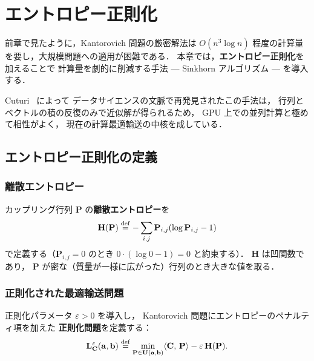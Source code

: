 
\chapter{エントロピー正則化}\label{chap:entropic}

前章で見たように，Kantorovich 問題の厳密解法は
$O(n^3 \log n)$ 程度の計算量を要し，大規模問題への適用が困難である．
本章では，\textbf{エントロピー正則化}を加えることで
計算量を劇的に削減する手法 --- Sinkhorn アルゴリズム --- を導入する．

Cuturi~\cite{Cuturi2013} によって
データサイエンスの文脈で再発見されたこの手法は，
行列とベクトルの積の反復のみで近似解が得られるため，
GPU 上での並列計算と極めて相性がよく，
現在の計算最適輸送の中核を成している．


\section{エントロピー正則化の定義}\label{sec:entropic-def}

\subsection{離散エントロピー}\label{subsec:discrete-entropy}

カップリング行列 $\mathbf{P}$ の\textbf{離散エントロピー}を
\begin{equation}\label{eq:entropy}
  \mathbf{H}(\mathbf{P})
  \overset{\mathrm{def}}{=} -\sum_{i,j} \mathbf{P}_{i,j}(\log \mathbf{P}_{i,j} - 1)
\end{equation}
で定義する（$\mathbf{P}_{i,j} = 0$ のとき $0 \cdot (\log 0 - 1) = 0$ と約束する）．
$\mathbf{H}$ は凹関数であり，
$\mathbf{P}$ が密な（質量が一様に広がった）行列のとき大きな値を取る．

\subsection{正則化された最適輸送問題}\label{subsec:regularized-ot}

正則化パラメータ $\varepsilon > 0$ を導入し，
Kantorovich 問題にエントロピーのペナルティ項を加えた
\textbf{正則化問題}を定義する：
\begin{equation}\label{eq:regularized-ot}
  \mathbf{L}^\varepsilon_{\mathbf{C}}(\mathbf{a}, \mathbf{b})
  \overset{\mathrm{def}}{=} \min_{\mathbf{P} \in \mathbf{U}(\mathbf{a}, \mathbf{b})}
  \langle \mathbf{C},\, \mathbf{P} \rangle - \varepsilon\, \mathbf{H}(\mathbf{P}).
\end{equation}

